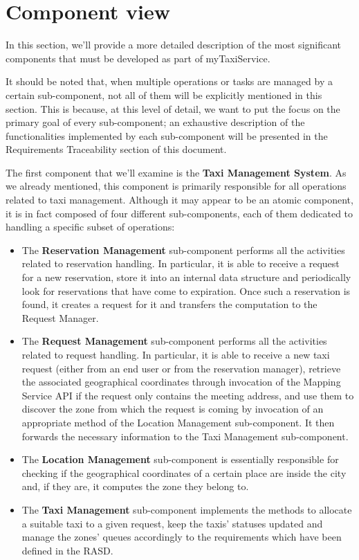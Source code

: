 \section{Component view}
In this section, we'll provide a more detailed description of the most significant components that must be developed as part of myTaxiService.

It should be noted that, when multiple operations or tasks are managed by a certain sub-component, not all of them will be explicitly mentioned in this section. This is because, at this level of detail, we want to put the focus on the primary goal of every sub-component; an exhaustive description of the functionalities implemented by each sub-component will be presented in the Requirements Traceability section of this document. 

The first component that we'll examine is the \textbf{Taxi Management System}. As we already mentioned, this component is primarily responsible for all operations related to taxi management. Although it may appear to be an atomic component, it is in fact composed of four different sub-components, each of them dedicated to handling a specific subset of operations:
	\begin{itemize}
		\item The \textbf{Reservation Management} sub-component performs all the activities related to reservation handling. In particular, it is able to receive a request for a new reservation, store it into an internal data structure and periodically look for reservations that have come to expiration. Once such a reservation is found, it creates a request for it and transfers the computation to the Request Manager.
		\item The \textbf{Request Management} sub-component performs all the activities related to request handling. In particular, it is able to receive a new taxi request (either from an end user or from the reservation manager), retrieve the associated geographical coordinates through invocation of the Mapping Service API if the request only contains the meeting address, and use them to discover the zone from which the request is coming by invocation of an appropriate method of the Location Management sub-component. It then forwards the necessary information to the Taxi Management sub-component.
		\item The \textbf{Location Management} sub-component is essentially responsible for checking if the geographical coordinates of a certain place are inside the city and, if they are, it computes the zone they belong to. 
		\item The \textbf{Taxi Management} sub-component implements the methods to allocate a suitable taxi to a given request, keep the taxis' statuses updated and manage the zones' queues accordingly to the requirements which have been defined in the RASD.
	\end{itemize}
	
